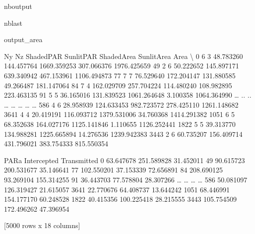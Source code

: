 \documentclass[letterpaper,10pt,english]{sphinxmanual}
\begin{document}
\begin{sphinxuseclass}{nboutput}
\begin{sphinxuseclass}{nblast}
{\begin{sphinxuseclass}{output_area}
\begin{sphinxuseclass}{}
\begin{sphinxVerbatim}[commandchars=\\\{\}]
      Ny  Nz   ShadedPAR   SunlitPAR   ShadedArea  SunlitArea         Area  \textbackslash{}
0      6   3   48.783260  144.457764  1669.359253  307.066376  1976.425659
49     2   6   50.222652  145.897171   639.340942  467.153961  1106.494873
77     7   7   76.529640  172.204147   131.880585   49.266487   181.147064
84     7   4  162.029709  257.704224   114.480240  108.982895   223.463135
91     5   5   36.165016  131.839523  1061.264648    3.100358  1064.364990
{\ldots}   ..  ..         {\ldots}         {\ldots}          {\ldots}         {\ldots}          {\ldots}
586    4   6   28.958939  124.633453   982.723572  278.425110  1261.148682
3641   4   4   20.419191  116.093712  1379.531006   34.760368  1414.291382
1051   6   5   68.352638  164.027176  1125.141846    1.110655  1126.252441
1822   5   5   39.313770  134.988281  1225.665894   14.276536  1239.942383
3443   2   6   60.735207  156.409714   431.796021  383.754333   815.550354

            PARa  Intercepted  Transmitted
0      63.647678   251.589828    31.452011
49     90.615723   200.531677    35.146641
77    102.550201    37.153339    72.656891
84    208.690125    93.269104   155.314255
91     36.443703    77.578804    28.307266
{\ldots}          {\ldots}          {\ldots}          {\ldots}
586    50.081097   126.319427    21.615057
3641   22.770676    64.408737    13.644242
1051   68.446991   154.177170    60.248528
1822   40.415356   100.225418    28.215555
3443  105.754509   172.496262    47.396954

[5000 rows x 18 columns]
\end{sphinxVerbatim}



\end{sphinxuseclass}
\end{sphinxuseclass}
}

\end{sphinxuseclass}
\end{sphinxuseclass}
\end{document}
